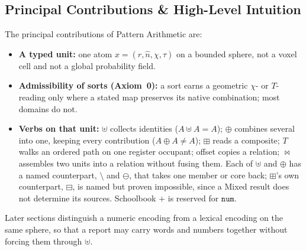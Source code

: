 \documentclass[12pt, a4paper]{article}
\begin{document}
\subsection{Principal Contributions \& High-Level Intuition}
The principal contributions of Pattern Arithmetic are:
\begin{itemize}
    \item \textbf{A typed unit:} one atom $x=(r,\hat n,\chi,\tau)$ on a bounded sphere, not a voxel cell and not a global probability field.
    \item \textbf{Admissibility of sorts (Axiom~0):} a sort earns a geometric $\chi$- or $T$-reading only where a stated map preserves its native combination; most domains do not.
    \item \textbf{Verbs on that unit:} $\uplus$ collects identities ($A\uplus A=A$); $\oplus$ combines several into one, keeping every contribution ($A\oplus A\ne A$); $\boxplus$ reads a composite; $T$ walks an ordered path on one register occupant; offset copies a relation; $\bowtie$ assembles two units into a relation without fusing them. Each of $\uplus$ and $\oplus$ has a named counterpart, $\setminus$ and $\ominus$, that takes one member or core back; $\boxplus$'s own counterpart, $\boxminus$, is named but proven impossible, since a Mixed result does not determine its sources. Schoolbook $+$ is reserved for $\mathtt{num}$.
\end{itemize}

Later sections distinguish a numeric encoding from a lexical encoding on the same sphere, so that a report may carry words and numbers together without forcing them through $\uplus$.
\end{document}
